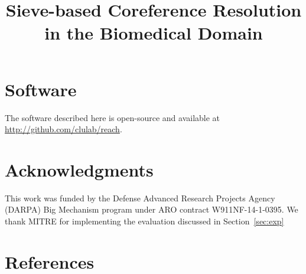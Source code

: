\documentclass[10pt, a4paper]{article}
\title{Sieve-based Coreference Resolution in the Biomedical Domain}
\begin{document}
\maketitleabstract






\section{Software}
The software described here is open-source and available at \url{http://github.com/clulab/reach}.

\section*{Acknowledgments}
This work was funded by the Defense Advanced Research Projects Agency (DARPA) Big Mechanism program under ARO contract W911NF-14-1-0395. We thank MITRE for implementing the evaluation discussed in Section~\ref{sec:exp}
\section{References}



\end{document}
